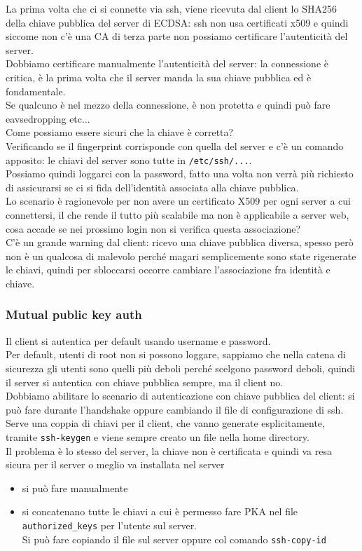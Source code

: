 \documentclass[12pt, oneside]{extbook} %
\begin{document}
La prima volta che ci si connette via ssh, viene ricevuta dal client lo SHA256 della chiave pubblica del server di ECDSA: ssh non usa certificati x509 e quindi siccome non c'è una CA di terza parte non possiamo certificare l'autenticità del server.
\\Dobbiamo certificare manualmente l'autenticità del server: la connessione è critica, è la prima volta che il server manda la sua chiave pubblica ed è fondamentale.
\\Se qualcuno è nel mezzo della connessione, è non protetta e quindi può fare eavsedropping etc...
\\Come possiamo essere sicuri che la chiave è corretta?\\Verificando se il fingerprint corrisponde con quella del server e c'è un comando apposito: le chiavi del server sono tutte in \texttt{/etc/ssh/...}.
\\Possiamo quindi loggarci con la password, fatto una volta non verrà più richiesto di assicurarsi se ci si fida dell'identità associata alla chiave pubblica.
\\Lo scenario è ragionevole per non avere un certificato X509 per ogni server a cui connettersi, il che rende il tutto più scalabile ma non è applicabile a server web, cosa accade se nei prossimo login non si verifica questa associazione?
\\C'è un grande warning dal client: ricevo una chiave pubblica diversa, spesso però non è un qualcosa di malevolo perché magari semplicemente sono state rigenerate le chiavi, quindi per sbloccarsi occorre cambiare l'associazione fra identità e chiave.

\subsubsection{Mutual public key auth}
Il client si autentica per default usando username e password.
\\Per default, utenti di root non si possono loggare, sappiamo che nella catena di sicurezza gli utenti sono quelli più deboli perché scelgono password deboli, quindi il server si autentica con chiave pubblica sempre, ma il client no.
\\Dobbiamo abilitare lo scenario di autenticazione con chiave pubblica del client: si può fare durante l'handshake oppure cambiando il file di configurazione di ssh.
\\Serve una coppia di chiavi per il client, che vanno generate esplicitamente, tramite \texttt{ssh-keygen} e viene sempre creato un file nella home directory.
\\Il problema è lo stesso del server, la chiave non è certificata e quindi va resa sicura per il server o meglio va installata nel server
\begin{itemize}
    \item si può fare manualmente
    \item si concatenano tutte le chiavi a cui è permesso fare PKA nel file \texttt{authorized\_keys} per l'utente sul server.
    \\Si può fare copiando il file sul server oppure col comando \texttt{ssh-copy-id}
\end{itemize}
\end{document}
